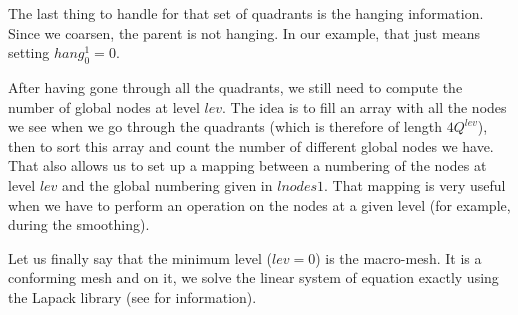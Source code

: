 The last thing to handle for that set of quadrants is the hanging information. Since we coarsen, the parent is not hanging. In our example, that just means setting $hang^1_0 = 0$. 

After having gone through all the quadrants, we still need to compute the number of global nodes at level $lev$. The idea is to fill an array with all the nodes we see when we go through the quadrants (which is therefore of length $4Q^{lev}$), then to sort this array and count the number of different global nodes we have. That also allows us to set up a mapping between a numbering of the nodes at level $lev$ and the global numbering given in $lnodes1$. That mapping is very useful when we have to perform an operation on the nodes at a given level (for example, during the smoothing). 
 
Let us finally say that the minimum level ($lev = 0$) is the macro-mesh. It is a conforming mesh and on it, we solve the linear system of equation exactly using the Lapack library (see \cite{lapack} for information).  
 












